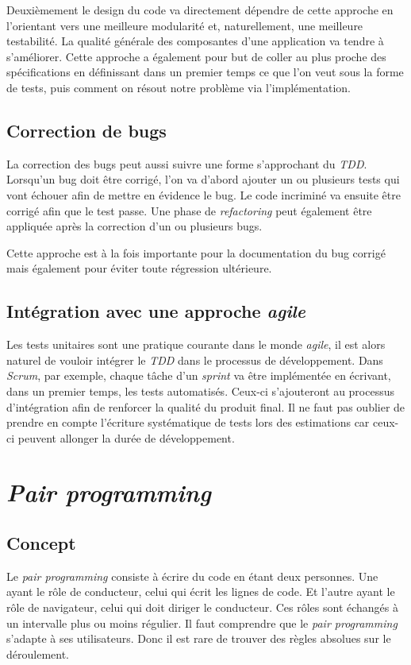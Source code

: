 \documentclass[journal, a4paper, frenchb]{IEEEtran}
\begin{document}
Deuxièmement le design du code va directement dépendre de cette approche en l'orientant vers une meilleure modularité et, naturellement, une meilleure testabilité. La qualité générale des composantes d'une application va tendre à s'améliorer. Cette approche a également pour but de coller au plus proche des spécifications en définissant dans un premier temps ce que l'on veut sous la forme de tests, puis comment on résout notre problème via l'implémentation.


\subsection{Correction de bugs}

La correction des bugs peut aussi suivre une forme s'approchant du \emph{TDD}. Lorsqu'un bug doit être corrigé, l'on va d'abord ajouter un ou plusieurs tests qui vont échouer afin de mettre en évidence le bug. Le code incriminé va ensuite être corrigé afin que le test passe. Une phase de \emph{refactoring} peut également être appliquée après la correction d'un ou plusieurs bugs.

Cette approche est à la fois importante pour la documentation du bug corrigé mais également pour éviter toute régression ultérieure.


\subsection{Intégration avec une approche \emph{agile}}

Les tests unitaires sont une pratique courante dans le monde \emph{agile}, il est alors naturel de vouloir intégrer le \emph{TDD} dans le processus de développement. Dans \emph{Scrum}, par exemple, chaque tâche d'un \emph{sprint} va être implémentée en écrivant, dans un premier temps, les tests automatisés. Ceux-ci s'ajouteront au processus d'intégration afin de renforcer la qualité du produit final. Il ne faut pas oublier de prendre en compte l'écriture systématique de tests lors des estimations car ceux-ci peuvent allonger la durée de développement.


\section{\emph{Pair programming}}
\subsection{Concept}
Le \emph{pair programming} consiste à écrire du code en étant deux personnes. Une ayant le rôle de conducteur, celui qui écrit les lignes de code. Et l’autre ayant le rôle de navigateur, celui qui doit diriger le conducteur. Ces rôles sont échangés à un intervalle plus ou moins régulier. Il faut comprendre que le \emph{pair programming} s’adapte à ses utilisateurs. Donc il est rare de trouver des règles absolues sur le déroulement.
\end{document}
